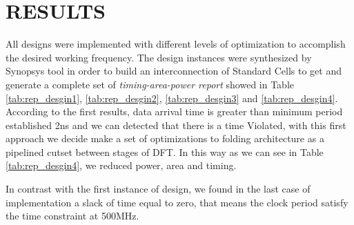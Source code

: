 \documentclass[journal,comsoc]{IEEEtran}
\begin{document}
\section{RESULTS}
All designs were implemented with different levels of optimization to accomplish the desired working frequency. The design instances were synthesized by Synopsys tool in order to build an interconnection of Standard Cells to get and generate a complete set of \textit{timing-area-power report} showed in Table \ref{tab:rep_desgin1}, \ref{tab:rep_desgin2}, \ref{tab:rep_desgin3} and  \ref{tab:rep_desgin4}. According to the first results, data arrival time is greater than minimum period established 2ns and we can detected that there is a time Violated, with this first approach we decide make a set of optimizations to folding architecture as a pipelined cutset between stages of DFT. In this way as we can see in Table \ref{tab:rep_desgin4}, we reduced power, area and timing. 

In contrast with the first instance of design, we found in the last case of implementation a slack of time equal to zero, that means the clock period satisfy the time constraint at 500MHz.
\end{document}
